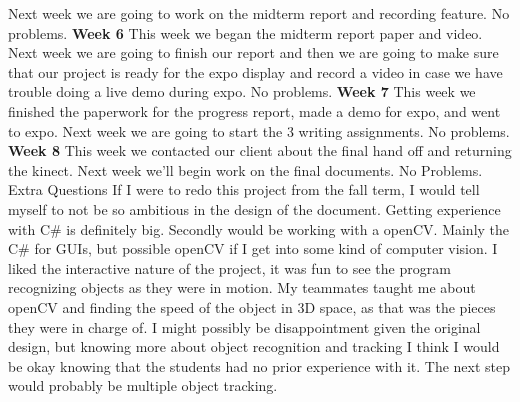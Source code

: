 \documentclass[onecolumn, draftclsnofoot,10pt, compsoc]{IEEEtran}
\begin{document}
\newline
Next week we are going to work on the midterm report and recording feature.
\newline
No problems.
\newline
\textbf{Week 6}
\newline
This week we began the midterm report paper and video.
\newline
Next week we are going to finish our report and then we are going to make sure that our project is ready for the expo display and record a video in case we have trouble doing a live demo during expo.
\newline
No problems.
\newline
\textbf{Week 7}
\newline
This week we finished the paperwork for the progress report, made a demo for expo, and went to expo.
\newline
Next week we are going to start the 3 writing assignments.
\newline
No problems.
\newline
\textbf{Week 8}
\newline
This week we contacted our client about the final hand off and returning the kinect.
\newline
Next week we'll begin work on the final documents.
\newline
No Problems.
\newline
Extra Questions
\newline
If I were to redo this project from the fall term, I would tell myself to not be so ambitious in the design of the document.
\newline
Getting experience with C\# is definitely big. Secondly would be working with a openCV.
\newline
Mainly the C\# for GUIs, but possible openCV if I get into some kind of computer vision.
\newline
I liked the interactive nature of the project, it was fun to see the program recognizing objects as they were in motion.
\newline
My teammates taught me about openCV and finding the speed of the object in 3D space, as that was the pieces they were in charge of.
\newline
I might possibly be disappointment given the original design, but knowing more about object recognition and tracking I think I would be okay knowing that the students had no prior experience with it.
\newline
The next step would probably be multiple object tracking.
\newline
\end{document}
